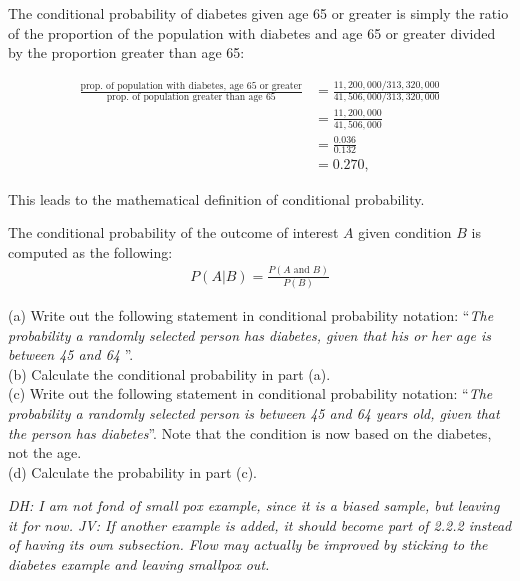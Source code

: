 The conditional probability of diabetes given age 65 or greater is simply the ratio of the proportion of the population with diabetes and age 65 or greater divided by the proportion greater than age 65:
 
\begin{align*}
    \frac{\text{prop. of population with diabetes, age 65 or greater}}{\text{prop. of population greater than age 65}} &= \frac{11,200,000/313,320,000}{41,506,000/313,320,000}\\
			&=\frac{11,200,000}{41,506,000} \\
	                               &= \frac{0.036}{0.132} \\
								   &= 0.270,
\end{align*}

This leads to the mathematical definition of conditional probability.

\begin{termBox}{
The conditional probability of the outcome of interest $A$ given condition $B$ is computed as the following:
\begin{align}
P(A | B) = \frac{P(A\text{ and }B)}{P(B)}
\label{condProbEq}
\end{align}}
\end{termBox}

\begin{exercise}\label{familyCollegeProbOfParentsEqualNotGivenTeen}
(a) Write out the following statement in conditional probability notation: ``\emph{The probability a randomly selected person has diabetes, given that his or her age is between 45 and 64 }''. \\[1mm]
(b) Calculate the conditional probability in part (a). \\[1mm]
(c) Write out the following statement in conditional probability notation: ``\emph{The probability a randomly selected person is between 45 and 64 years old, given that the person has diabetes}''. Note that the condition is now based on the {diabetes}, not the {age}. \\[1mm]
(d) Calculate the probability in part (c).
\end{exercise}



\textit{DH: I am not fond of small pox example, since it is a biased sample, but leaving it for now. JV: If another example is added, it should become part of 2.2.2 instead of having its own subsection. Flow may actually be improved by sticking to the diabetes example and leaving smallpox out.}

